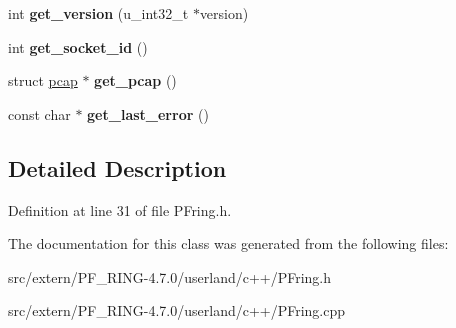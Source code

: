 \begin{DoxyCompactItemize}
\item 
\hypertarget{class_p_fring_a3c44d5a7b9aaf23a38fd89aec8d1dd95}{
int {\bfseries get\_\-version} (u\_\-int32\_\-t $\ast$version)}
\label{class_p_fring_a3c44d5a7b9aaf23a38fd89aec8d1dd95}

\item 
\hypertarget{class_p_fring_a9b81038fa61d2deaa79284b0de8373c3}{
int {\bfseries get\_\-socket\_\-id} ()}
\label{class_p_fring_a9b81038fa61d2deaa79284b0de8373c3}

\item 
\hypertarget{class_p_fring_a5eca7d1b79413b9ac7ac5d1ae9d58dbf}{
struct \hyperlink{structpcap}{pcap} $\ast$ {\bfseries get\_\-pcap} ()}
\label{class_p_fring_a5eca7d1b79413b9ac7ac5d1ae9d58dbf}

\item 
\hypertarget{class_p_fring_a0e52d36d6d1c513c8377d4fab60b8d9a}{
const char $\ast$ {\bfseries get\_\-last\_\-error} ()}
\label{class_p_fring_a0e52d36d6d1c513c8377d4fab60b8d9a}

\end{DoxyCompactItemize}


\subsection{Detailed Description}


Definition at line 31 of file PFring.h.



The documentation for this class was generated from the following files:\begin{DoxyCompactItemize}
\item 
src/extern/PF\_\-RING-\/4.7.0/userland/c++/PFring.h\item 
src/extern/PF\_\-RING-\/4.7.0/userland/c++/PFring.cpp\end{DoxyCompactItemize}
